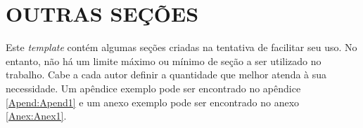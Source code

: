 \chapter{\textbf{OUTRAS SEÇÕES}}

Este \textit{template} contém algumas seções criadas na tentativa de facilitar seu uso. No entanto, não há um limite máximo ou mínimo de seção a ser utilizado no trabalho. Cabe a cada autor definir a quantidade que melhor atenda à sua necessidade.
Um apêndice exemplo pode ser encontrado no apêndice \ref{Apend:Apend1} e um anexo exemplo pode ser encontrado no anexo \ref{Anex:Anex1}. 
